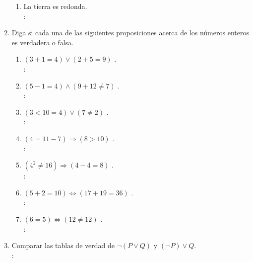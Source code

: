 \begin{enumerate}[label=0.1.\arabic*]
\begin{enumerate}[label=(\arabic*)]
		\item La tierra es redonda. \\
		\solucion: \\
		
	\end{enumerate}

	\item Diga si cada una de las siguientes proposiciones acerca de los números enteros es verdadera o falsa.
	\begin{enumerate}[label=(\arabic*)]
		\item $ (3+1 = 4) \vee (2+5 = 9) $ . \\
		\solucion: \\
		
		\item $ (5-1 = 4) \wedge (9+12 \neq 7) $ . \\
		\solucion: \\
		
		\item $ (3<10 = 4) \vee (7 \neq 2) $ . \\
		\solucion: \\
		
		\item $ (4 = 11-7) \Longrightarrow (8>10) $ . \\
		\solucion: \\
		
		\item $ (4^2 \neq 16) \Longrightarrow (4-4 = 8) $ . \\
		\solucion: \\
		
		\item $ (5+2 = 10) \Longleftrightarrow (17+19=36) $ . \\
		\solucion: \\
		
		\item $ (6 = 5) \Longleftrightarrow (12 \neq 12) $ . \\
		\solucion: \\
		
	\end{enumerate}

	\item Comparar las tablas de verdad de $ \neg (P \vee Q) $ y $ (\neg P) \vee Q $. \\
	\solucion: \\
	

\end{enumerate}
